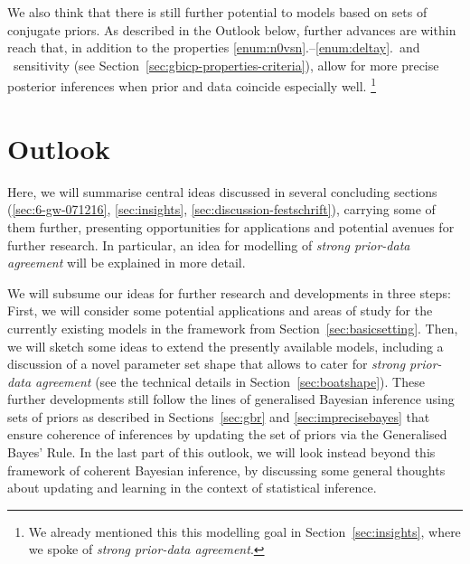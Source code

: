 We also think that there is still further potential to models based on sets of conjugate priors.
As described in the Outlook below,
further advances are within reach 
that, in addition to the properties \ref{enum:n0vsn}.--\ref{enum:deltay}.\ and \pdc\ sensitivity
(see Section~\ref{sec:gbicp-properties-criteria}),
allow for more precise posterior inferences when prior and data coincide especially well.%
\footnote{We already mentioned this this modelling goal in Section~\ref{sec:insights},
where we spoke of \emph{strong prior-data agreement}.}



\section{Outlook}
\label{sec:concluding-outlook}

Here, we will summarise central ideas discussed in several concluding sections
(\ref{sec:6-gw-071216}, \ref{sec:insights}, \ref{sec:discussion-festschrift}),
carrying some of them further, presenting 
opportunities for applications and potential avenues for further research.
In particular, an idea for modelling of \emph{strong prior-data agreement} will be explained in more detail.

We will subsume our ideas for further research and developments in three steps:
First, we will consider some potential applications and areas of study for the
currently existing models in the framework from Section~\ref{sec:basicsetting}.
Then, we will sketch some ideas to extend the presently available models,
including a discussion of a novel parameter set shape that allows to cater for
\emph{strong prior-data agreement} (see the technical details in Section~\ref{sec:boatshape}).
These further developments still follow the lines %
of generalised Bayesian inference using sets of priors as described in Sections~\ref{sec:gbr} and \ref{sec:imprecisebayes}
that ensure coherence of inferences by updating the set of priors via the Generalised Bayes' Rule.
In the last part of this outlook, we will look instead beyond this framework
of coherent Bayesian inference, by discussing some general thoughts
about updating and learning in the context of statistical inference.

\medskip


